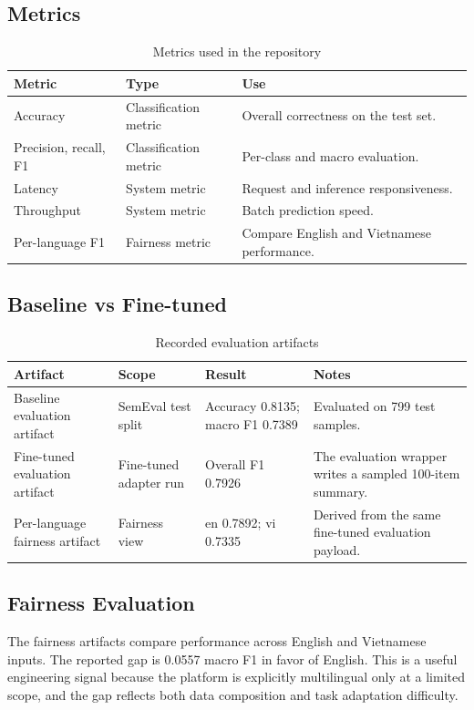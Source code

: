 \documentclass[12pt, a4paper]{article}
\begin{document}
\subsection{Metrics}
\begin{table}[H]
\centering
\caption{Metrics used in the repository}
\begin{tabularx}{\textwidth}{@{} p{2.7cm} p{2.5cm} X @{}}
\toprule
\textbf{Metric} & \textbf{Type} & \textbf{Use} \\
\midrule
Accuracy & Classification metric & Overall correctness on the test set. \\
Precision, recall, F1 & Classification metric & Per-class and macro evaluation. \\
Latency & System metric & Request and inference responsiveness. \\
Throughput & System metric & Batch prediction speed. \\
Per-language F1 & Fairness metric & Compare English and Vietnamese performance. \\
\bottomrule
\end{tabularx}
\end{table}

\subsection{Baseline vs Fine-tuned}
\begin{table}[H]
\centering
\caption{Recorded evaluation artifacts}
\begin{tabularx}{\textwidth}{@{} p{3.4cm} p{2.5cm} p{2.5cm} X @{}}
\toprule
\textbf{Artifact} & \textbf{Scope} & \textbf{Result} & \textbf{Notes} \\
\midrule
Baseline evaluation artifact & SemEval test split & Accuracy 0.8135; macro F1 0.7389 & Evaluated on 799 test samples. \\
Fine-tuned evaluation artifact & Fine-tuned adapter run & Overall F1 0.7926 & The evaluation wrapper writes a sampled 100-item summary. \\
Per-language fairness artifact & Fairness view & en 0.7892; vi 0.7335 & Derived from the same fine-tuned evaluation payload. \\
\bottomrule
\end{tabularx}
\end{table}

\subsection{Fairness Evaluation}
The fairness artifacts compare performance across English and Vietnamese inputs. The reported gap is 0.0557 macro F1 in favor of English. This is a useful engineering signal because the platform is explicitly multilingual only at a limited scope, and the gap reflects both data composition and task adaptation difficulty.
\end{document}
